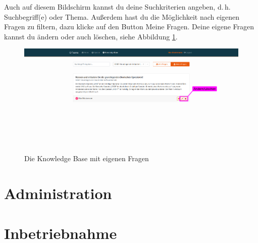 \documentclass[a4paper,11pt,listof=numbered,glossary=totoc,parskip=half,toc=bib]{scrreprt}
\newcommand{\dash}{\mbox{d.\,h.}\xspace}
\begin{document}
\begin{appendices}
	Auch auf diesem Bildschirm kannst du deine Suchkriterien angeben, \dash Suchbegriff(e) oder Thema. Außerdem hast du die Möglichkeit nach eigenen Fragen zu filtern, dazu klicke auf den Button Meine Fragen. Deine eigene Fragen kannst du ändern oder auch löschen, siehe Abbildung \ref{fig:guide_kb_eigene}.
		
	\begin{figure}[h!]
		\centering
		\includegraphics[width=\textwidth]{UserGuide/Knowledge_Base_eigene.png}
		\caption{Die Knowledge Base mit eigenen Fragen}
		\label{fig:guide_kb_eigene}
	\end{figure}	
			
	
	


	





	
	
							
	\chapter{Administration}
	\chapter{Inbetriebnahme}
	
	\end{appendices}
	\newpage	
	\setcounter{chapter}{\thelastRomanCounter} %
\renewcommand \thechapter{\Roman{chapter}}	\printbibliography[heading=bibnumbered,title=Literaturverzeichnis]
\end{document}
